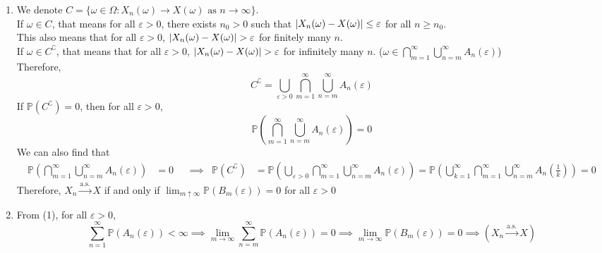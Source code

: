 \documentclass{huhtakm-template-book}
\newcommand{\prob}{\mathbb{P}}
\begin{document}
\begin{proofing}
    \begin{enumerate}
        \item We denote $C=\{\omega\in\Omega:X_{n}(\omega)\to X(\omega)\text{ as }n\to\infty\}$.\\
        If $\omega\in C$, that means for all $\varepsilon>0$, there exists $n_{0}>0$ such that $\left|{X_{n}(\omega)-X(\omega)}\right|\leq\varepsilon$ for all $n\geq n_{0}$.\\
        This also means that for all $\varepsilon>0$, $\abs{X_{n}(\omega)-X(\omega)}>\varepsilon$ for finitely many $n$.\\
        If $\omega\in C^{\complement}$, that means that for all $\varepsilon>0$, $\abs{X_{n}(\omega)-X(\omega)}>\varepsilon$ for infinitely many $n$. ($\omega\in\bigcap_{m=1}^{\infty}\bigcup_{n=m}^{\infty}A_{n}(\varepsilon)$)\\
        Therefore,
        \begin{equation*}
            C^{\complement}=\bigcup_{\varepsilon>0}\bigcap_{m=1}^{\infty}\bigcup_{n=m}^{\infty}A_{n}(\varepsilon)
        \end{equation*}
        If $\prob(C^{\complement})=0$, then for all $\varepsilon>0$,
        \begin{equation*}
            \prob\left(\bigcap_{m=1}^{\infty}\bigcup_{n=m}^{\infty}A_{n}(\varepsilon)\right)=0
        \end{equation*}
        We can also find that
        \begin{align*}
            \prob\left(\bigcap_{m=1}^{\infty}\bigcup_{n=m}^{\infty}A_{n}(\varepsilon)\right)&=0 & &\implies & \prob(C^{\complement})&=\prob\left(\bigcup_{\varepsilon>0}\bigcap_{m=1}^{\infty}\bigcup_{n=m}^{\infty}A_{n}(\varepsilon)\right)=\prob\left(\bigcup_{k=1}^{\infty}\bigcap_{m=1}^{\infty}\bigcup_{n=m}^{\infty}A_{n}\left(\frac{1}{k}\right)\right)=0
        \end{align*}
        Therefore, $X_{n}\xrightarrow{\text{a.s.}}X$ if and only if $\lim_{m\uparrow\infty}\prob(B_{m}(\varepsilon))=0$ for all $\varepsilon>0$
        \item From (1), for all $\varepsilon>0$,
        \begin{equation*}
            \sum_{n=1}^{\infty}\prob(A_{n}(\varepsilon))<\infty\implies\lim_{m\to\infty}\sum_{n=m}^{\infty}\prob(A_{n}(\varepsilon))=0\implies\lim_{m\to\infty}\prob(B_{m}(\varepsilon))=0\implies(X_{n}\xrightarrow{\text{a.s.}}X)
        \end{equation*}
    \end{enumerate}
\end{proofing}
\end{document}
